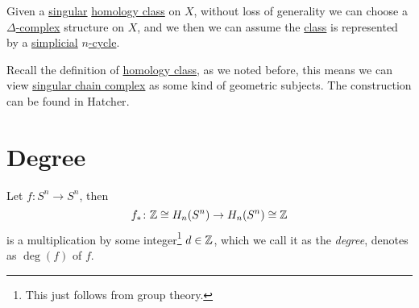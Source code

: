\begin{corollary}
	Given a \hyperref[def:singular-homology-group]{singular} \hyperref[def:homology-class]{homology class} on \(X\), without loss of generality we can choose a
	\hyperref[def:delta-complex]{\(\Delta \)-complex} structure on \(X\), and we then we can assume the \hyperref[def:homology-class]{class} is represented by a
	\hyperref[def:simplicial-complex]{simplicial} \hyperref[def:cycle]{\(n\)-cycle}.
\end{corollary}
\begin{remark}
	Recall the definition of \hyperref[def:homology-class]{homology class}, as we noted before, this means we can view
	\hyperref[def:singular-chain-complex]{singular chain complex} as some kind of geometric subjects. The construction can be found in Hatcher\cite{hatcher2002algebraic}.
\end{remark}

\section{Degree}
\begin{definition}[Degree]\label{def:degree}
	Let \(f \colon S^n \to S^n\), then
	\[
		f_\ast \colon \mathbb{\MakeUppercase{z}} \cong H_n(S^n) \to H_n(S^n) \cong \mathbb{\MakeUppercase{z}}
	\]
	is a multiplication by some integer\footnote{This just follows from group theory.} \(d \in \mathbb{\MakeUppercase{z}}\),
	which we call it as the \emph{degree}, denotes as \(\deg(f)\) of \(f\).
\end{definition}


